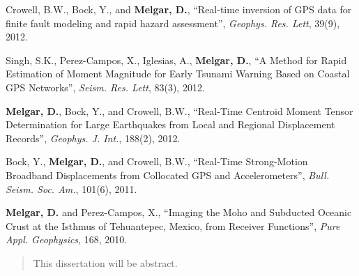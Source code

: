 \begin{frontmatter}
\begin{vitapage}
\begin{publications}
\item Crowell, B.W., Bock, Y., and \textbf{Melgar, D.}, ``Real-time inversion of GPS data for finite fault modeling and rapid hazard assessment'', \emph{Geophys. Res. Lett}, 39(9), 2012.
\item Singh, S.K., Perez-Campos, X., Iglesias, A., \textbf{Melgar, D.}, ``A Method for Rapid Estimation of Moment Magnitude for Early Tsunami Warning Based on Coastal GPS Networks'', \emph{Seism. Res. Lett}, 83(3), 2012.
\item \textbf{Melgar, D.}, Bock, Y., and Crowell, B.W., ``Real-Time Centroid Moment Tensor Determination for Large Earthquakes from Local and Regional Displacement Records'', \emph{Geophys. J. Int.}, 188(2), 2012.
\item Bock, Y., \textbf{Melgar, D.}, and Crowell, B.W., ``Real-Time Strong-Motion Broadband Displacements from Collocated GPS and Accelerometers'', \emph{Bull. Seism. Soc. Am.}, 101(6), 2011.
\item \textbf{Melgar, D.} and Perez-Campos, X., ``Imaging the Moho and Subducted Oceanic Crust at the Isthmus of Tehuantepec, Mexico, from Receiver Functions'', \emph{Pure Appl. Geophysics}, 168, 2010.

\end{publications}
\end{vitapage}


%
%
\begin{abstract}
  This dissertation will be abstract. 
\end{abstract}


\end{frontmatter}
